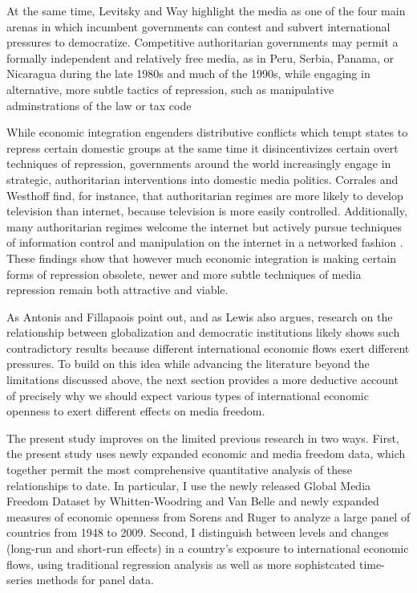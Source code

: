 \documentclass[12pt,a4paper]{article}\usepackage[]{graphicx}\usepackage[]{color}
\begin{document}
At the same time, Levitsky and Way highlight the media as one of the four main arenas in which incumbent governments can contest and subvert international pressures to democratize. Competitive authoritarian governments may permit a formally independent and relatively free media, as in Peru, Serbia, Panama, or Nicaragua during the late 1980s and much of the 1990s, while engaging in alternative, more subtle tactics of repression, such as manipulative adminstrations of the law or tax code \parencite[53, 58]{Levitsky:2002gx}

While economic integration engenders distributive conflicts which tempt states to repress certain domestic groups at the same time it disincentivizes certain overt techniques of repression, governments around the world increasingly engage in strategic, authoritarian interventions into domestic media politics. Corrales and Westhoff \parencite*{Corrales:2006vz} find, for instance, that authoritarian regimes are more likely to develop television than internet, because television is more easily controlled. Additionally, many authoritarian regimes welcome the internet but actively pursue techniques of information control and manipulation on the internet in a networked fashion \parencites{MacKinnon:2011id}{Pearce:2012fm}. These findings show that however much economic integration is making certain forms of repression obsolete, newer and more subtle techniques of media repression remain both attractive and viable.

As Antonis and Fillapaois point out, and as Lewis also argues, research on the relationship between globalization and democratic institutions likely shows such contradictory results because different international economic flows exert different pressures. To build on this idea while advancing the literature beyond the limitations discussed above, the next section provides a more deductive account of precisely why we should expect various types of international economic openness to exert different effects on media freedom.

The present study improves on the limited previous research in two ways. First, the present study uses newly expanded economic and media freedom data, which together permit the most comprehensive quantitative analysis of these relationships to date. In particular, I use the newly released Global Media Freedom Dataset by Whitten-Woodring and Van Belle \parencites{Belle:1997wo}{van2000press} and newly expanded measures of economic openness from Sorens and Ruger \parencite{Sorens:2012hc} to analyze a large panel of countries from 1948 to 2009. Second, I distinguish between levels and changes (long-run and short-run effects) in a country's exposure to international economic flows, using traditional regression analysis as well as more sophistcated time-series methods for panel data.
\end{document}
